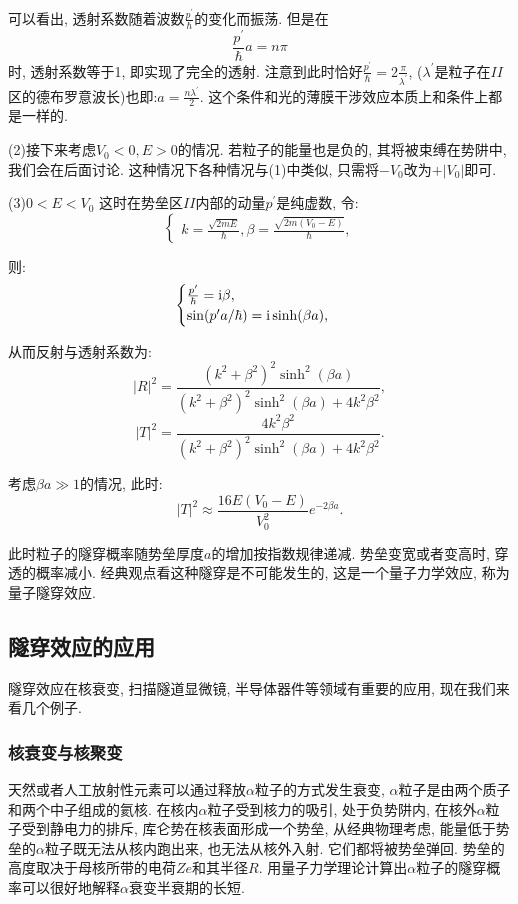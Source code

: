 可以看出, 透射系数随着波数$\frac{p^{\prime}}{\hbar}$的变化而振荡. 但是在
\[
\frac{p^{\prime}}{\hbar}a = n\pi
\]
时, 透射系数等于1, 即实现了完全的透射. 注意到此时恰好$\frac{p^{\prime}}{\hbar} = 2\frac{\pi}{\lambda^{\prime}}$, ($\lambda^{\prime}$是粒子在$II$区的德布罗意波长)也即:$a = \frac{n\lambda^{\prime}}{2}$. 这个条件和光的薄膜干涉效应本质上和条件上都是一样的.

(2)接下来考虑$V_0<0, E>0$的情况. 若粒子的能量也是负的, 其将被束缚在势阱中, 我们会在后面讨论. 这种情况下各种情况与(1)中类似, 只需将$-V_0$改为$+|V_0|$即可.

(3)$0<E<V_0$
这时在势垒区$II$内部的动量$p^{\prime}$是纯虚数, 令:
\[
\begin{cases}
k = \frac{\sqrt{2mE}}{\hbar},
\beta = \frac{\sqrt{2m(V_0-E)}}{\hbar},
\end{cases}
\]

则:
\[
\begin{cases}
  \frac{p^{\prime}}{\hbar} = \mathop{}\!\mathrm{i}\beta, \\
  \sin(p^{\prime}a/\hbar) = \mathop{}\!\mathrm{i}\sinh(\beta a), \\
\end{cases}
\]

从而反射与透射系数为:
\[
|R|^2 = \frac{(k^2+\beta^2)^2\sinh^2(\beta a)}{(k^2+\beta^2)^2\sinh^2(\beta a) + 4k^2\beta^2},
\]
\[
|T|^2 = \frac{4k^2\beta^2}{(k^2+\beta^2)^2\sinh^2(\beta a) + 4k^2\beta^2}.
\]

考虑$\beta a \gg 1$的情况, 此时:
\[
|T|^2 \approx \frac{16E(V_0-E)}{V_0^2}e^{-2\beta a}.
\]

此时粒子的隧穿概率随势垒厚度$a$的增加按指数规律递减. 势垒变宽或者变高时, 穿透的概率减小. 经典观点看这种隧穿是不可能发生的, 这是一个量子力学效应, 称为量子隧穿效应.
\subsection{隧穿效应的应用}
隧穿效应在核衰变, 扫描隧道显微镜, 半导体器件等领域有重要的应用, 现在我们来看几个例子.
\subsubsection{核衰变与核聚变}
天然或者人工放射性元素可以通过释放$\alpha$粒子的方式发生衰变, $\alpha$粒子是由两个质子和两个中子组成的氦核. 在核内$\alpha$粒子受到核力的吸引, 处于负势阱内, 在核外$\alpha$粒子受到静电力的排斥, 库仑势在核表面形成一个势垒, 从经典物理考虑, 能量低于势垒的$\alpha$粒子既无法从核内跑出来, 也无法从核外入射. 它们都将被势垒弹回. 势垒的高度取决于母核所带的电荷$Ze$和其半径$R$. 用量子力学理论计算出$\alpha$粒子的隧穿概率可以很好地解释$\alpha$衰变半衰期的长短.

